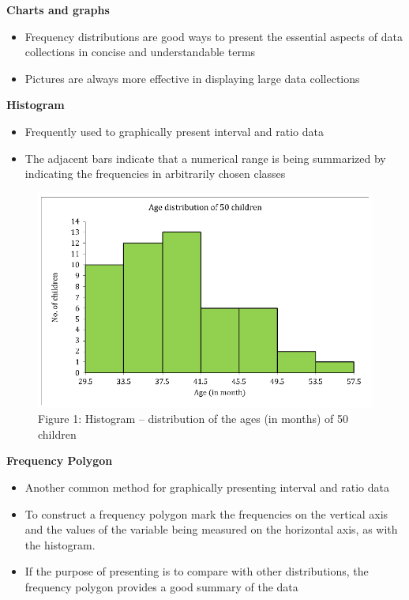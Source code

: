 \documentclass[
  a4paper,
  DIV=11,
  numbers=noendperiod,
  oneside]{scrreprt}
\providecommand{\tightlist}{%
  \setlength{\itemsep}{0pt}\setlength{\parskip}{0pt}}\usepackage{longtable,booktabs,array}
\begin{document}
\textbf{Charts and graphs}

\begin{itemize}
\tightlist
\item
  Frequency distributions are good ways to present the essential aspects
  of data collections in concise and understandable terms
\item
  Pictures are always more effective in displaying large data
  collections
\end{itemize}

\textbf{Histogram}

\begin{itemize}
\tightlist
\item
  Frequently used to graphically present interval and ratio data
\item
  The adjacent bars indicate that a numerical range is being summarized
  by indicating the frequencies in arbitrarily chosen classes
\end{itemize}

\begin{figure}

{\centering \includegraphics[width=5.20833in,height=\textheight]{images/ch2/picture2.png}

}

\caption{Figure 1: Histogram -- distribution of the ages (in months) of
50 children}

\end{figure}

\textbf{Frequency Polygon}

\begin{itemize}
\tightlist
\item
  Another common method for graphically presenting interval and ratio
  data
\item
  To construct a frequency polygon mark the frequencies on the vertical
  axis and the values of the variable being measured on the horizontal
  axis, as with the histogram.
\item
  If the purpose of presenting is to compare with other distributions,
  the frequency polygon provides a good summary of the data
\end{itemize}
\end{document}
